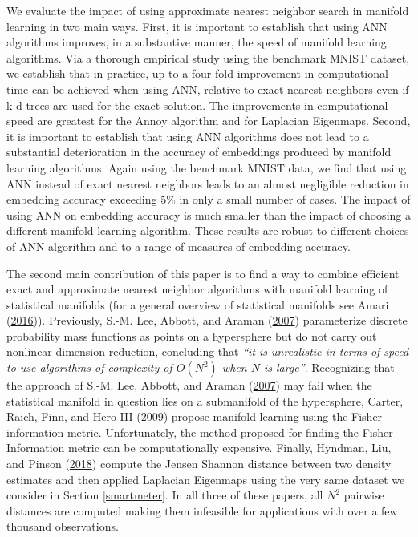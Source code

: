 \documentclass[12pt]{article}
\begin{document}
We evaluate the impact of using approximate nearest neighbor search in manifold learning in two main ways. First, it is important to establish that using ANN algorithms improves, in a substantive manner, the speed of manifold learning algorithms. Via a thorough empirical study using the benchmark MNIST dataset, we establish that in practice, up to a four-fold improvement in computational time can be achieved when using ANN, relative to exact nearest neighbors even if k-d trees are used for the exact solution. The improvements in computational speed are greatest for the Annoy algorithm and for Laplacian Eigenmaps. Second, it is important to establish that using ANN algorithms does not lead to a substantial deterioration in the accuracy of embeddings produced by manifold learning algorithms. Again using the benchmark MNIST data, we find that using ANN instead of exact nearest neighbors leads to an almost negligible reduction in embedding accuracy exceeding 5\% in only a small number of cases. The impact of using ANN on embedding accuracy is much smaller than the impact of choosing a different manifold learning algorithm. These results are robust to different choices of ANN algorithm and to a range of measures of embedding accuracy.

The second main contribution of this paper is to find a way to combine efficient exact and approximate nearest neighbor algorithms with manifold learning of statistical manifolds (for a general overview of statistical manifolds see Amari (\protect\hyperlink{ref-amari2016}{2016})). Previously, S.-M. Lee, Abbott, and Araman (\protect\hyperlink{ref-lee2007}{2007}) parameterize discrete probability mass functions as points on a hypersphere but do not carry out nonlinear dimension reduction, concluding that \emph{``it is unrealistic in terms of speed to use algorithms of complexity of \(O(N^2)\) when \(N\) is large''}. Recognizing that the approach of S.-M. Lee, Abbott, and Araman (\protect\hyperlink{ref-lee2007}{2007}) may fail when the statistical manifold in question lies on a submanifold of the hypersphere, Carter, Raich, Finn, and Hero III (\protect\hyperlink{ref-carter2009}{2009}) propose manifold learning using the Fisher information metric. Unfortunately, the method proposed for finding the Fisher Information metric can be computationally expensive. Finally, Hyndman, Liu, and Pinson (\protect\hyperlink{ref-Hyndman2018-nq}{2018}) compute the Jensen Shannon distance between two density estimates and then applied Laplacian Eigenmaps using the very same dataset we consider in Section \ref{smartmeter}. In all three of these papers, all \(N^2\) pairwise distances are computed making them infeasible for applications with over a few thousand observations.
\end{document}
